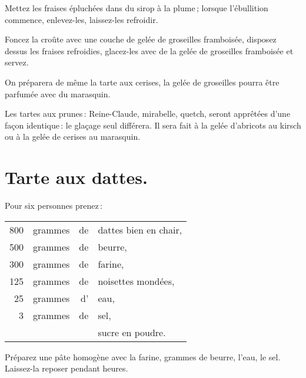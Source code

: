 Mettez les fraises épluchées dans du sirop à la plume ; lorsque l'ébullition
commence, enlevez-les, laissez-les refroidir.

Foncez la croûte avec une couche de gelée de groseilles framboisée, disposez
dessus les fraises refroidies, glacez-les avec de la gelée de groseilles
framboisée et servez.

\sk

On préparera de même la tarte aux cerises, la gelée de groseilles pourra être
parfumée avec du marasquin.

\sk

Les tartes aux prunes : Reine-Claude, mirabelle, quetch, seront apprêtées d'une
façon identique : le glaçage seul différera. Il sera fait à la gelée d'abricots au
kirsch ou à la gelée de cerises au marasquin.

\section*{\centering Tarte aux dattes.}
{}

Pour six personnes prenez :

\footnotesize
\begin{longtable}{rrrp{16em}}
    800 & grammes & de & dattes bien en chair,                                                            \\
    500 & grammes & de & beurre,                                                                          \\
    300 & grammes & de & farine,                                                                          \\
    125 & grammes & de & noisettes mondées,                                                               \\
     25 & grammes & d' & eau,                                                                             \\
      3 & grammes & de & sel,                                                                             \\
        &         &    & sucre en poudre.                                                                 \\
\end{longtable}
\normalsize

Préparez une pâte homogène avec la farine, {\mmm} grammes de beurre,
l'eau, le sel. Laissez-la reposer pendant {\mmm} heures.

